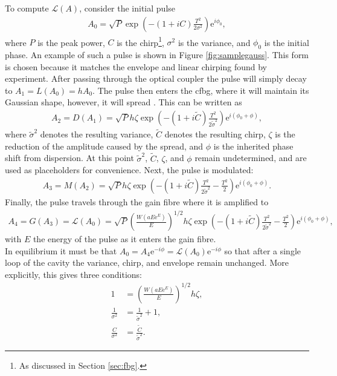 To compute $\mathcal{L}(A)$, consider the initial pulse
\begin{align}
	A_0 = \sqrt{P} \exp \left( -(1 + iC) \frac{T^2}{2 \sigma^2} \right) \textrm{e}^{i \phi_0},
\label{eq:A0}
\end{align}
where $P$ is the peak power, $C$ is the chirp\footnote{As discussed in Section \ref{sec:fbg}.}, $\sigma^2$ is the variance, and $\phi_0$ is the initial phase. An example of such a pulse is shown in Figure \ref{fig:samplegauss}. This form is chosen because it matches the envelope and linear chirping found by experiment. After passing through the optical coupler the pulse will simply decay to $A_1 = L(A_0) = h A_0$. The pulse then enters the \gls{cfbg}, where it will maintain its Gaussian shape, however, it will spread \cite{agrawal2013, ferreira, silfvast}. This can be written as
\begin{align}
A_2 = D(A_1) = \sqrt{P} h \zeta \exp \left( -(1 + i \widetilde{C}) \frac{T^2}{2 \widetilde{\sigma}^2} \right) \textrm{e}^{i(\phi_0 + \phi)},
\end{align}
where $\widetilde{\sigma}^2$ denotes the resulting variance, $\widetilde{C}$ denotes the resulting chirp, $\zeta$ is the reduction of the amplitude caused by the spread, and $\phi$ is the inherited phase shift from dispersion. At this point $\widetilde{\sigma}^2$, $\widetilde{C}$, $\zeta$, and $\phi$ remain undetermined, and are used as placeholders for convenience. Next, the pulse is modulated:
\begin{align}
A_3 = M(A_2) = \sqrt{P} h \zeta \exp \left( -(1 + i \widetilde{C}) \frac{T^2}{2 \widetilde{\sigma}^2} - \frac{T^2}{2} \right) \textrm{e}^{i(\phi_0 + \phi)}.
\end{align}
Finally, the pulse travels through the gain fibre where it is amplified to
\begin{align}
A_4 = G(A_3) = \mathcal{L}(A_0) = \sqrt{P} \left( \frac{W(a E \textrm{e}^E)}{E} \right)^{1/2} h \zeta \exp \left( -(1 + i \widetilde{C}) \frac{T^2}{2 \widetilde{\sigma}^2} - \frac{T^2}{2} \right) \textrm{e}^{i(\phi_0 + \phi)},
\label{eq:A4}
\end{align}
with $E$ the energy of the pulse as it enters the gain fibre. \\

In equilibrium it must be that $A_0 = A_4 \textrm{e}^{-i \phi} = \mathcal{L}(A_0) \textrm{e}^{- i \phi}$ so that after a single loop of the cavity the variance, chirp, and envelope remain unchanged. More explicitly, this gives three conditions:
\begin{subequations}
\begin{align}
\label{eq:energycond}
1 &= \left( \frac{W(a E \textrm{e}^E)}{E} \right)^{1/2} h \zeta, \\
\label{eq:varcond}
\frac{1}{\sigma^2} &= \frac{1}{\widetilde{\sigma}^2} + 1, \\
\label{eq:chirpcond}
\frac{C}{\sigma^2} &= \frac{\widetilde{C}}{\widetilde{\sigma}^2}.
\end{align}
\label{eq:linsys}
\end{subequations}
\vspace{-5mm}
